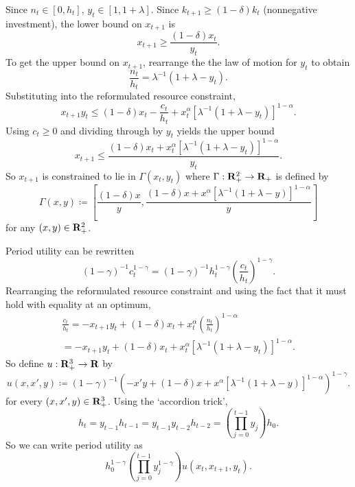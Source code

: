 \documentclass[11pt,letterpaper,reqno,oneside]{article}
\begin{document}
Since $n_t \in [0,h_t]$, $y_t \in [1,1+\lambda]$. Since $k_{t+1} \geq (1-\delta) k_t$ (nonnegative investment), the lower bound on $x_{t+1}$ is
%
\begin{equation*}
	x_{t+1} \geq \frac{ ( 1 - \delta ) x_t }{ y_t } .
\end{equation*}
%
To get the upper bound on $x_{t+1}$, rearrange the the law of motion for $y_t$ to obtain
%
\begin{equation*}
	\frac{n_t}{h_t} = \lambda^{-1} ( 1 + \lambda - y_t ) .
\end{equation*}
%
Substituting into the reformulated resource constraint,
%
\begin{equation*}
	x_{t+1} y_t
	\leq 
	(1-\delta) x_t
	- \frac{c_t}{h_t}
	+ x_t^\alpha \left[ \lambda^{-1} ( 1 + \lambda - y_t ) \right]^{1-\alpha}  .
\end{equation*}
%
Using $c_t \geq 0$ and dividing through by $y_t$ yields the upper bound
%
\begin{equation*}
	x_{t+1} 
	\leq 
	\frac{ (1-\delta) x_t
	+ x_t^\alpha \left[ \lambda^{-1} ( 1 + \lambda - y_t ) \right]^{1-\alpha} }
	{ y_t } .
\end{equation*}
%
So $x_{t+1}$ is constrained to lie in $\Gamma(x_t,y_t)$ where $\Gamma : \mathbf{R}_+^2 \to \mathbf{R}_+$ is defined by
%
\begin{equation*}
	\Gamma(x,y) \coloneqq \left[
	\frac{ ( 1 - \delta ) x }{ y } ,
	\frac{ (1-\delta) x
	+ x^\alpha \left[ \lambda^{-1} ( 1 + \lambda - y ) \right]^{1-\alpha} }
	{ y }
	\right]
\end{equation*}
%
for any $(x,y) \in \mathbf{R}_+^2$.


Period utility can be rewritten
%
\begin{equation*}
	(1-\gamma)^{-1} c_t^{1-\gamma}
	= (1-\gamma)^{-1} h_t^{1-\gamma} 
	\left( \frac{c_t}{h_t} \right)^{1-\gamma} .
\end{equation*}
%
Rearranging the reformulated resource constraint and using the fact that it must hold with equality at an optimum,
%
\begin{multline*}
	\frac{c_t}{h_t} 
	= - x_{t+1} y_t + (1-\delta) x_t 
	+ x_t^\alpha \left( \frac{n_t}{h_t} \right)^{1-\alpha} 
	\\
	= - x_{t+1} y_t + (1-\delta) x_t 
	+ x_t^\alpha \left[ \lambda^{-1} ( 1 + \lambda - y_t ) \right]^{1-\alpha} .
\end{multline*}
%
So define $u : \mathbf{R}^3_+ \to \mathbf{R}$ by
%
\begin{equation*}
	u(x,x',y) \coloneqq
	(1-\gamma)^{-1} 
	\left( 
	- x' y + (1-\delta) x
	+ x^\alpha \left[ \lambda^{-1} ( 1 + \lambda - y ) \right]^{1-\alpha} 
	\right)^{1-\gamma} .
\end{equation*}
%
for every $\left(x,x',y\right) \in \mathbf{R}_+^3$. Using the `accordion trick',
%
\begin{equation*}
	h_t 
	= y_{t-1} h_{t-1}
	= y_{t-1} y_{t-2} h_{t-2}
	= \left( \prod_{j=0}^{t-1} y_j \right) h_0 .
\end{equation*}
%
So we can write period utility as
%
\begin{equation*}
	h_0^{1-\gamma} \left( \prod_{j=0}^{t-1} y_j^{1-\gamma} \right) 
	u\left( x_t, x_{t+1}, y_t \right) .
\end{equation*}
\end{document}
